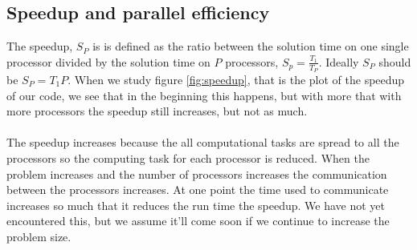 \subsection*{Speedup and parallel efficiency}
The speedup, $S_P$ is is defined as the ratio between the solution time on one single processor divided by the solution time on $P$ processors, $S_p=\frac{T_1}{T_P}$. Ideally $S_P$ should be $S_P=T_1P$. When we study figure \ref{fig:speedup}, that is the plot of the speedup of our code, we see that in the beginning this happens, but with more that with more processors the speedup still increases, but not as much.
\\ \\
The speedup increases because the all computational tasks are spread to all the processors so the computing task for each processor is reduced. When the problem increases and the number of processors increases the communication between the processors increases. At one point the time used to communicate increases so much that it reduces the run time the speedup. We have not yet encountered this, but we assume it'll come soon if we continue to increase the problem size.

